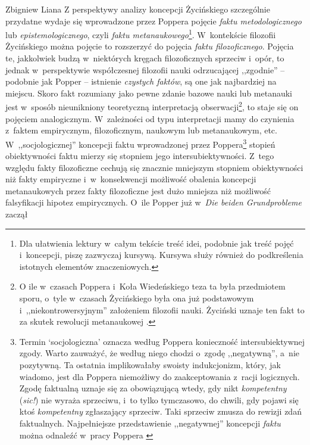 \begin{artplenv}{Zbigniew Liana}
Z perspektywy analizy koncepcji Życińskiego szczególnie przydatne wydaje się wprowadzone przez Poppera pojęcie
\textit{faktu metodologicznego} lub \textit{epistemologicznego}, czyli \textit{faktu metanaukowego}\footnote{Dla ułatwienia
lektury w~całym tekście treść idei, podobnie jak treść pojęć i~koncepcji, piszę zazwyczaj kursywą. Kursywa służy
również do podkreślenia istotnych elementów znaczeniowych.}. W~kontekście filozofii Życińskiego można pojęcie to
rozszerzyć do pojęcia \textit{faktu filozoficznego}. Pojęcia te, jakkolwiek budzą w~niektórych kręgach filozoficznych
sprzeciw i~opór, to jednak w~perspektywie współczesnej filozofii nauki odrzucającej ,,zgodnie'' -- podobnie jak Popper --
istnienie \textit{czystych faktów}, są one jak najbardziej na miejscu. Skoro fakt rozumiany jako pewne zdanie bazowe
nauki lub metanauki jest w~sposób nieunikniony teoretyczną interpretacją obserwacji\footnote{O ile w~czasach Poppera i~Koła
Wiedeńskiego teza ta była przedmiotem sporu, o~tyle w~czasach Życińskiego była ona już podstawowym i~,,niekontrowersyjnym''
założeniem filozofii nauki. Życiński uznaje ten fakt to za skutek rewolucji metanaukowej
\parencite[zob.][s.~127]{zycinski_elementy_1996}.
}, to staje się on pojęciem analogicznym. W~zależności od
typu interpretacji mamy do czynienia z~faktem empirycznym, filozoficznym, naukowym lub metanaukowym,
etc. W~,,socjologicznej'' koncepcji faktu wprowadzonej przez Poppera\footnote{Termin `socjologiczna' oznacza według Poppera
konieczność intersubiektywnej zgody. Warto zauważyć, że według niego chodzi o~zgodę ,,negatywną'', a~nie pozytywną. Ta
ostatnia implikowałaby swoisty indukcjonizm, który, jak wiadomo, jest dla Poppera niemożliwy do zaakceptowania z~racji
logicznych. Zgodę faktualną uznaje się za obowiązującą wtedy, gdy nikt \textit{kompetentny} (\textit{sic!}) nie wyraża
sprzeciwu, i~to tylko tymczasowo, do chwili, gdy pojawi się ktoś \textit{kompetentny} zgłaszający sprzeciw. Taki sprzeciw
zmusza do rewizji zdań faktualnych. Najpełniejsze przedstawienie ,,negatywnej'' koncepcji \textit{faktu} można odnaleźć w~pracy Poppera
\parencite*[s.~122–135, zwł. 131n.]{popper_beiden_1979}
} stopień obiektywności faktu mierzy się stopniem
jego intersubiektywności. Z~tego względu fakty filozoficzne cechują się znacznie mniejszym stopniem obiektywności niż
fakty empiryczne i~w~konsekwencji możliwość obalenia koncepcji metanaukowych przez fakty filozoficzne jest dużo
mniejsza niż możliwość falsyfikacji hipotez empirycznych. O~ile Popper już w~\textit{Die beiden Grundprobleme} zaczął

\end{artplenv}
